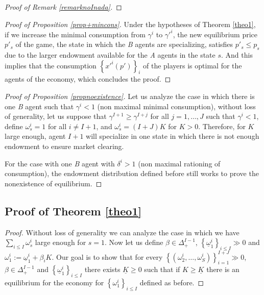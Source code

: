 \documentclass[pdftex]{article}
\numberwithin{equation}{section}
\theoremstyle{th}
\newtheorem{proof lemma}{{Proof Lemma}.}
\theoremstyle{definition}
\newtheorem*{risk lovers}{Risk lovers}
\newtheorem*{risk averse}{Risk averse}
\begin{document}
{\begin{proof}[Proof of Remark \ref{remarknoInada}]
\end{proof}

\begin{proof}[Proof of Proposition \ref{prop+mincons}]
Under the hypotheses of Theorem \ref{theo1}, if we increase the minimal consumption from $\gamma^i$ to $\gamma'^i$, the new equilibrium price $p'_s$ of the game, the state in which the \emph{B} agents are specializing, satisfies $p'_s\leq p_s$ due to the larger endowment available for the \emph{A} agents in the state $s$. And this implies that the consumption $\left\{x'^i(p')\right\}_i$ of the players is optimal for the agents of the economy, which concludes the proof.

\end{proof}

\begin{proof}[Proof of Proposition \ref{propnoexistence}]

Let us analyze the case in which there is one \emph{B} agent such that $\gamma^i<1$ (non maximal minimal consumption), without loss of generality, let us suppose that $\gamma^{I+1}\geq\gamma^{I+j}$ for all $j=1,\dots,J$ such that $\gamma^i<1$, define $\omega^i_s=1$ for all $i\neq I+1$, and $\omega^i_s={(I+J)K}$ for $K>0$. Therefore, for $K$ large enough, agent $I+1$ will specialize in one state in which there is not enough endowment to ensure market clearing.

For the case with one \emph{B} agent with $\delta^i>1$ (non maximal rationing of consumption), the endowment distribution defined before still works to prove the nonexistence of equilibrium.
\end{proof}



\subsection{Proof of Theorem \ref{theo1}}
\label{prooftheo1}
\begin{proof}
Without loss of generality we can analyze the case in which we have  $\sum_{i\leq{I}}\omega_s^i$ large enough for $s=1$. Now let us define $\beta\in\Delta_+^{I-1}$, $\left\{\underline{\omega}_1^i\right\}_{i\leq{I}}\gg0$ and $\omega_1^i:=\underline{\omega}_1^i+\beta_i{K}$. Our goal is to show that for every $\left\{\left(\omega^i_2,\dots,\omega^i_S\right)\right\}_{i=1}^{I+J}\gg0$, $\beta\in\Delta_+^{I-1}$ and $\left\{\underline{\omega}_1^i\right\}_{i\leq{I}}$ there exists $\underline{K}\geq0$ such that if $K\geq\underline{K}$ there is an equilibrium for the economy for $\left\{\omega_1^{i}\right\}_{i\leq{I}}$ defined as before.


\end{proof}}
\end{document}
